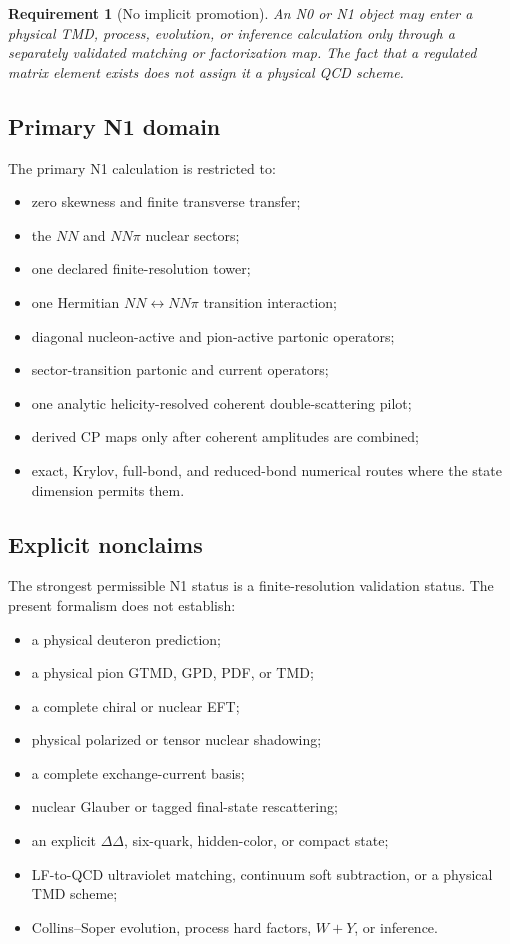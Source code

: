 \documentclass[11pt]{article}
\newtheorem{requirement}[definition]{Requirement}
\begin{document}
\begin{requirement}[No implicit promotion]
An N0 or N1 object may enter a physical TMD, process, evolution, or inference
calculation only through a separately validated matching or factorization map.
The fact that a regulated matrix element exists does not assign it a physical
QCD scheme.
\end{requirement}

\subsection{Primary N1 domain}

The primary N1 calculation is restricted to:
\begin{itemize}
\item zero skewness and finite transverse transfer;
\item the \(NN\) and \(NN\pi\) nuclear sectors;
\item one declared finite-resolution tower;
\item one Hermitian \(NN\leftrightarrow NN\pi\) transition interaction;
\item diagonal nucleon-active and pion-active partonic operators;
\item sector-transition partonic and current operators;
\item one analytic helicity-resolved coherent double-scattering pilot;
\item derived CP maps only after coherent amplitudes are combined;
\item exact, Krylov, full-bond, and reduced-bond numerical routes where the
state dimension permits them.
\end{itemize}

\subsection{Explicit nonclaims}

The strongest permissible N1 status is a finite-resolution validation status.
The present formalism does not establish:
\begin{itemize}
\item a physical deuteron prediction;
\item a physical pion GTMD, GPD, PDF, or TMD;
\item a complete chiral or nuclear EFT;
\item physical polarized or tensor nuclear shadowing;
\item a complete exchange-current basis;
\item nuclear Glauber or tagged final-state rescattering;
\item an explicit \(\Delta\Delta\), six-quark, hidden-color, or compact state;
\item LF-to-QCD ultraviolet matching, continuum soft subtraction, or a
physical TMD scheme;
\item Collins--Soper evolution, process hard factors, \(W+Y\), or inference.
\end{itemize}
\end{document}
